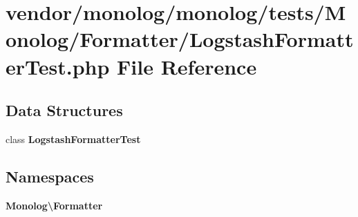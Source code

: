 \section{vendor/monolog/monolog/tests/\+Monolog/\+Formatter/\+Logstash\+Formatter\+Test.php File Reference}
\label{_logstash_formatter_test_8php}
\subsection*{Data Structures}
\begin{DoxyCompactItemize}
\item 
class {\bf Logstash\+Formatter\+Test}
\end{DoxyCompactItemize}
\subsection*{Namespaces}
\begin{DoxyCompactItemize}
\item 
 {\bf Monolog\textbackslash{}\+Formatter}
\end{DoxyCompactItemize}
